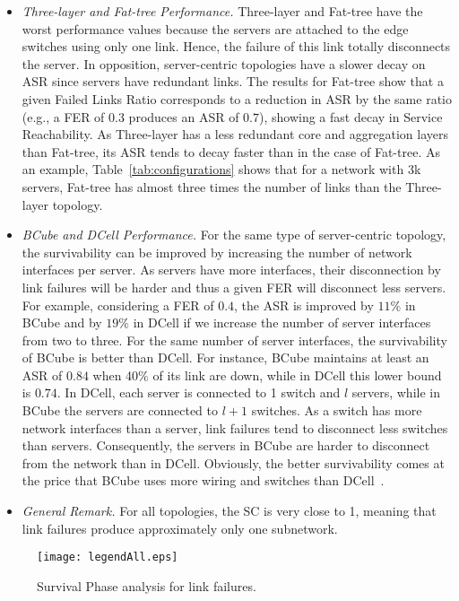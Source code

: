 \begin{itemize}
\item \textit{Three-layer and Fat-tree Performance.} Three-layer and Fat-tree have the worst performance values because the servers are attached to the edge switches using only one link. Hence, the failure of this link totally disconnects the server. In opposition, server-centric topologies have a slower decay on ASR since servers have redundant links. The results for Fat-tree show that a given Failed Links Ratio corresponds to a reduction in ASR by the same ratio (e.g., a FER of $0.3$ produces an ASR of $0.7$), showing a fast decay in Service Reachability. As Three-layer has a less redundant core and aggregation layers than Fat-tree, its ASR tends to decay faster than in the case of Fat-tree. As an example, Table~\ref{tab:configurations} shows that for a network with 3k servers, Fat-tree has almost three times the number of links than the Three-layer topology.
\item \textit{BCube and DCell Performance.} For the same type of server-centric topology, the survivability can be improved by increasing the number of network interfaces per server. As servers have more interfaces, their disconnection by link failures will be harder and thus a given FER will disconnect less servers. For example, considering a FER of $0.4$, the ASR is improved by $11\%$ in BCube and by $19\%$ in DCell if we increase the number of server interfaces from two to three. For the same number of server interfaces, the survivability of BCube is better than DCell. For instance, BCube maintains at least an ASR of $0.84$ when 40\% of its link are down, while in DCell this lower bound is $0.74$.
In DCell, each server is connected to 1 switch and $l$ servers, while in BCube the servers are connected to $l+1$ switches. As a switch has more network interfaces than a server, link failures tend to disconnect less switches than servers. Consequently, the servers in BCube are harder to disconnect from the network than in DCell. Obviously, the better survivability comes at the price that BCube uses more wiring and switches than DCell~\cite{guo2009bcube}.
\item \textit{General Remark.} For all topologies, the SC is very close to 1, meaning that link failures produce approximately only one subnetwork.
\end{itemize}
\begin{figure}
\centering
{}
{\texttt{[image: legendAll.eps]}}
\caption{Survival Phase analysis for link failures.}
\end{figure}

